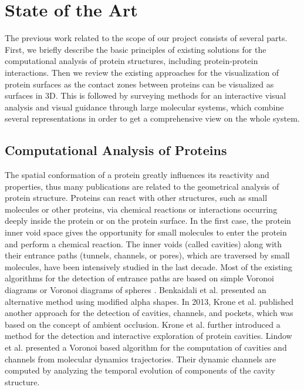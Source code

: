 \documentclass[11pt,a4paper,titlepage,oneside,onecolumn]{article}
\begin{document}
\section{State of the Art}
\label{sec:StateOfTheArt}
The previous work related to the scope of our project consists of several parts. 
First, we briefly describe the basic principles of existing solutions for the computational analysis of protein structures, including protein-protein interactions. 
Then we review the existing approaches for the visualization of protein surfaces as the contact zones between proteins can be visualized as surfaces in 3D.
This is followed by surveying methods for an interactive visual analysis and visual guidance through large molecular systems, which combine several representations in order to get a comprehensive view on the whole system. 

\subsection{Computational Analysis of Proteins}
The spatial conformation of a protein greatly influences its reactivity and properties, thus many publications are related to the geometrical analysis of protein structure. 
Proteins can react with other structures, such as small molecules or other proteins, via chemical reactions or interactions occurring deeply inside the protein or on the protein surface.
In the first case, the protein inner void space gives the opportunity for small molecules to enter the protein and perform a chemical reaction. 
The inner voids (called cavities) along with their entrance paths (tunnels, channels, or pores), which are traversed by small molecules, have been intensively studied in the last decade.   
Most of the existing algorithms for the detection of entrance paths are based on simple Voronoi diagrams \cite{caver,mole,molaxis} or Voronoi diagrams of spheres \cite{Kim,Lindow2011}. Benkaidali et al. \cite{Benkaidali} presented an alternative method using modified alpha shapes. 
In 2013, Krone et al. \cite{Krone2013} published another approach for the detection of cavities, channels, and pockets, which was based on the concept of ambient occlusion. 
Krone et al. \cite{Krone2011} further introduced a method for the detection and interactive exploration of protein cavities. 
Lindow et al. \cite{Lindow2012} presented a Voronoi based algorithm for the computation of cavities and channels from molecular dynamics trajectories. 
Their dynamic channels are computed by analyzing the temporal evolution of components of the cavity structure.
\end{document}

